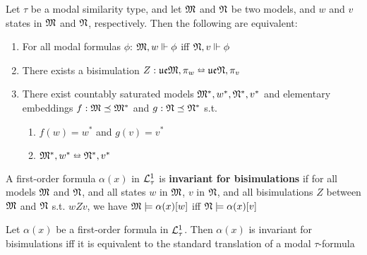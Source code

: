 \documentclass[11pt]{article}
\newcommand{\ue}{\fu\fe}
\begin{document}
\begin{lemma}
Let \(\tau\) be a modal similarity type, and let \(\mathfrak{M}\) and \(\mathfrak{N}\) be two models,
and \(w\) and \(v\) states in \(\mathfrak{M}\) and \(\mathfrak{N}\), respectively. Then the
following are equivalent:
\begin{enumerate}
\item For all modal formulas \(\phi\): \(\mathfrak{M},w\Vdash\phi\) iff \(\mathfrak{N},v\Vdash\phi\)
\item There exists a bisimulation \(Z:\ue\fM,\pi_w\leftrightarroweq\ue\fN,\pi_v\)
\item There exist countably saturated models \(\mathfrak{M}^*,w^*,\mathfrak{N}^*,v^*\) and elementary
embeddings \(f:\mathfrak{M}\preceq\mathfrak{M}^*\) and \(g:\mathfrak{N}\preceq\mathfrak{N}^*\) s.t.
\begin{enumerate}
\item \(f(w)=w^*\) and \(g(v)=v^*\)
\item \(\mathfrak{M}^*,w^*\leftrightarroweq\mathfrak{N}^*,v^*\)
\end{enumerate}
\end{enumerate}
\end{lemma}

\begin{definition}[]
A first-order formula \(\alpha(x)\) in \(\mathcal{L}^1_\tau\) is \textbf{invariant for
bisimulations} if for all models \(\mathfrak{M}\) and \(\mathfrak{N}\), and all states \(w\) in
\(\mathfrak{M}\), \(v\) in \(\mathfrak{N}\), and all bisimulations \(Z\) between \(\mathfrak{M}\) and
\(\mathfrak{N}\) s.t. \(wZv\), we have \(\mathfrak{M}\models\alpha(x)[w]\) iff \(\mathfrak{N}\models\alpha(x)[v]\)
\end{definition}

\begin{theorem}
Let \(\alpha(x)\) be a first-order formula in \(\mathcal{L}_\tau^1\). Then \(\alpha(x)\) is
invariant for bisimulations iff it is equivalent to the standard translation
of a modal \(\tau\)-formula
\end{theorem}
\end{document}
